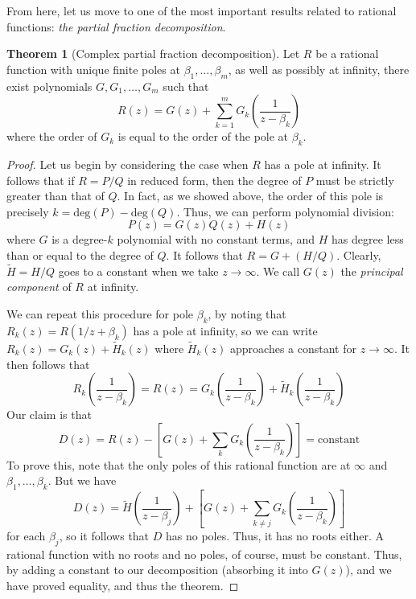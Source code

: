 \documentclass[aps,pra,showpacs,notitlepage,onecolumn,superscriptaddress,nofootinbib]{revtex4-1}
\theoremstyle{definition}
\newtheorem{theorem}{Theorem}[section]
\begin{document}
\noindent From here, let us move to one of the most important results related to rational functions: \emph{the partial fraction decomposition}.

\begin{theorem}[Complex partial fraction decomposition]
  Let $R$ be a rational function with unique finite poles at $\beta_1, \dots, \beta_m$, as well as possibly at infinity, there exist polynomials
  $G, G_1, \dots, G_m$ such that
  \begin{equation}
    R(z) = G(z) + \displaystyle\sum_{k = 1}^{m} G_k \left( \frac{1}{z - \beta_k} \right)
  \end{equation}
  where the order of $G_k$ is equal to the order of the pole at $\beta_k$.
\end{theorem}
\begin{proof}
  Let us begin by considering the case when $R$ has a pole at infinity. It follows that if $R = P/Q$ in reduced form, then the degree of $P$ must
  be strictly greater than that of $Q$. In fact, as we showed above, the order of this pole is precisely $k = \text{deg}(P) - \text{deg}(Q)$. Thus, we can perform polynomial division:
  \begin{equation}
    P(z) = G(z) Q(z) + H(z)
  \end{equation}
  where $G$ is a degree-$k$ polynomial with no constant terms, and $H$ has degree less than or equal to the degree of $Q$. It follows that $R = G + (H/Q)$. Clearly, $\widetilde{H} = H/Q$ goes to a constant
  when we take $z \to \infty$. We call $G(z)$ the \emph{principal component} of $R$ at infinity.

  We can repeat this procedure for pole $\beta_k$, by noting that $R_k(z) = R(1/z + \beta_k)$ has a pole at infinity, so we can write $R_k(z) = G_k(z) + \widetilde{H}_k(z)$
  where $\widetilde{H}_k(z)$ approaches a constant for $z \to \infty$. It then follows that
  \begin{equation}
    R_k\left( \frac{1}{z - \beta_k} \right) = R \left(z\right) = G_k\left( \frac{1}{z - \beta_k} \right) + \widetilde{H}_k\left( \frac{1}{z - \beta_k} \right)
  \end{equation}
  Our claim is that
  \begin{equation}
    D(z) = R(z) - \left[ G(z) + \displaystyle\sum_{k} G_k \left( \frac{1}{z - \beta_k} \right) \right] = \text{constant}
  \end{equation}
  To prove this, note that the only poles of this rational function are at $\infty$ and $\beta_1, \dots, \beta_k$. But we have
  \begin{equation}
    D(z) = \widetilde{H} \left( \frac{1}{z - \beta_j} \right) + \left[ G(z) + \displaystyle\sum_{k \neq j} G_k \left( \frac{1}{z - \beta_k} \right) \right]
  \end{equation}
  for each $\beta_j$, so it follows that $D$ has no poles. Thus, it has no roots either. A rational function with no roots and no poles, of course, must be constant.
  Thus, by adding a constant to our decomposition (absorbing it into $G(z)$), and we have proved equality, and thus the theorem.
  \end{proof}
\end{document}
